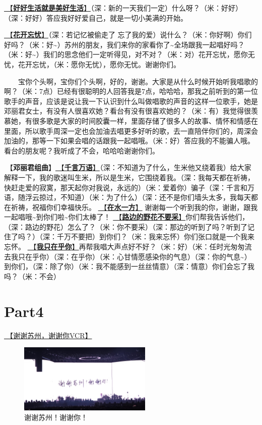 \documentclass[]{ctexbook}
\begin{document}
\hyperref[live-happy-life-happy]{🎵【\textbf{好好生活就是美好生活}】}（深：新的一天我们一定）什么呀？（米：好好）（深：好好）答应我好好爱自己，就是一切小美满的开始。

\hyperref[no-worries]{🎵【\textbf{花开忘忧}】}（深：若记忆被偷走了 忘了我的爱）说什么？（米：你好啊）你们好吗？（米：好\textasciitilde）苏州的朋友，我们来你的家看你了\textasciitilde 全场跟我一起唱好吗？（米：好\textasciitilde）我们的思念他们一定听得见，对不对？（米：对）花开忘忧，愿你无忧，花开忘忧，（米：愿你无忧），愿你无忧。谢谢你们。

  宝你个头啊，宝你们个头啊，好的，谢谢。大家是从什么时候开始听我唱歌的啊？（米：7点）已经有很聪明的人回答我是7点，哈哈哈，那我之前听到的第一位歌手的声音，应该是说让我一下认识到什么叫做唱歌的声音的这样一位歌手，她是邓丽君女士，有没有人很喜欢她？看台有没有很喜欢她的？（米：有）我觉得很羡慕她，有很多歌是大家的时间胶囊一样，里面存储了很多人的故事、情怀和情感在里面，所以歌手周深一定也会加油去唱更多好听的歌，去一直陪伴你们的，周深会加油的，那等一下如果会唱的话跟我一起唱哦。（米：好）答应我的不能骗人哦。看台的朋友呢？我听成了不会，哈哈哈谢谢你们。

🎵【\textbf{邓丽君组曲}】\hyperref[thousands-of-words]{🎵【\textbf{千言万语}】}（深：不知道为了什么，生米他又绕着我）给大家解释一下，我的歌迷叫生米，所以是生米，它围绕着我。（深：我每天都在祈祷，快赶走爱的寂寞，那天起你对我说，永远的）（米：爱着你）骗子（深：千言和万语，随浮云掠过，不知道）（米：为了什么）（深：还不是你们墙头太多，我每天都在祈祷，祝福你们幸福快乐。
\hyperref[on-the-water-side]{🎵【\textbf{在水一方}】} 谢谢每一个听到我的你，谢谢，跟我一起唱哦\textasciitilde 到你们啦\textasciitilde 你们太棒了！
\hyperref[only-with-me]{🎵【\textbf{路边的野花不要采}】}你们帮我告诉他们，（深：路边的野花）怎么了？（米：你不要采）（深：那边的听到了吗？听到了记住了吗？）（深：千万不要把）到你们？（米：我来忘怀）你们张口就是一个我来忘怀。
\hyperref[only-you]{🎵【\textbf{我只在乎你}】}再帮我唱大声点好不好？（米：好）（米：任时光匆匆流去我只在乎你）（深：在乎你）（米：心甘情愿感染你的气息）（深：你的气息\textasciitilde）到你们，（深：除了你）（米：我不能感到一丝丝情意）（深：情意）你们会忘了我吗？（米：不会）

\section{Part4}\label{suzhou-20241110-part4}

\hyperref[thank-you-vcr]{🎥【谢谢苏州，谢谢你VCR】}

\begin{figure}

{\centering \includegraphics[width=180pt]{img/suzhou20241110/thank-suzhou} 

}

\caption{谢谢苏州！谢谢你！}\label{fig:unnamed-chunk-121}
\end{figure}
\end{document}
